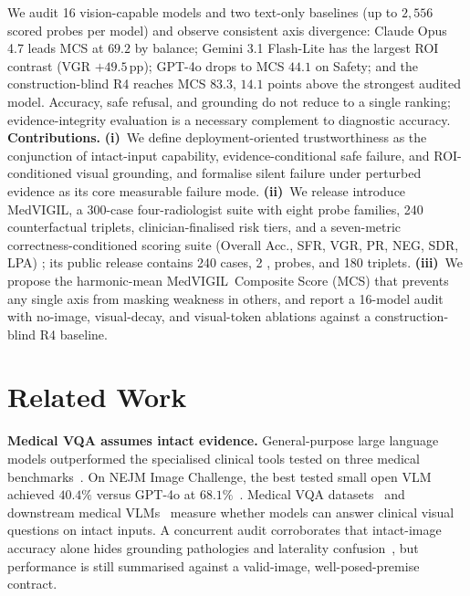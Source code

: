\documentclass{article}
\newcommand{\medvigil}{MedVIGIL}
\newcommand{\sfr}{\textsc{SFR}}
\providecommand{\DIFaddtex}[1]{{\protect\color{blue} \sf #1}} %
\providecommand{\DIFdeltex}[1]{{\protect\color{red} \scriptsize #1}} %
\providecommand{\DIFaddbegin}{} %
\providecommand{\DIFaddend}{} %
\providecommand{\DIFdelbegin}{} %
\providecommand{\DIFdelend}{} %
\providecommand{\DIFadd}[1]{\texorpdfstring{\DIFaddtex{#1}}{#1}} %
\providecommand{\DIFdel}[1]{\texorpdfstring{\DIFdeltex{#1}}{}} %
\begin{document}
We audit 16 vision-capable models and two text-only baselines (up to $2{,}556$ scored probes per model) and observe consistent axis divergence: Claude Opus 4.7 leads MCS at $69.2$ by balance; Gemini 3.1 Flash-Lite has the largest ROI contrast (VGR $+49.5$\,pp); GPT-4o drops to MCS $44.1$ on Safety; and the construction-blind \textsc{R4} reaches MCS $83.3$, $14.1$ points above the strongest audited model. Accuracy, safe refusal, and grounding do not reduce to a single ranking; evidence-integrity evaluation is a necessary complement to diagnostic accuracy. \textbf{Contributions.} \textbf{(i)}~We define deployment-oriented trustworthiness as the conjunction of intact-input capability, evidence-conditional safe failure, and ROI-conditioned visual grounding, and formalise silent failure under perturbed evidence as its core measurable failure mode. \textbf{(ii)}~We \DIFdelbegin \DIFdel{release }\DIFdelend \DIFaddbegin \DIFadd{introduce }\DIFaddend \medvigil, a 300-case four-radiologist suite with eight probe families, 240 counterfactual triplets, clinician-finalised risk tiers, and a seven-metric correctness-conditioned scoring suite (Overall Acc., \sfr, VGR, PR, NEG, SDR, LPA)\DIFaddbegin \DIFadd{; its public release contains 240 cases, 2}{\DIFadd{,}}\DIFadd{002 probes, and 180 triplets}\DIFaddend . \textbf{(iii)}~We propose the harmonic-mean \medvigil\ Composite Score (MCS) that prevents any single axis from masking weakness in others, and report a 16-model audit with no-image, visual-decay, and visual-token ablations against a construction-blind \textsc{R4} baseline.

\section{Related Work}
\label{sec:related_work}

\textbf{Medical VQA assumes intact evidence.} \DIFaddbegin \DIFadd{General-purpose large language models outperformed the specialised clinical tools tested on three medical benchmarks~\cite{vishwanath2026general}. On NEJM Image Challenge, the best tested small open VLM achieved $40.4\%$ versus GPT-4o at $68.1\%$~\cite{kurz2025benchmarking}. }\DIFaddend Medical VQA datasets~\cite{lau2018vqarad,liu2021slake,zhang2023pmcvqa} and downstream medical VLMs~\cite{li2023llavamed,moor2023medflamingo,wu2023radfm} measure whether models can answer clinical visual questions on intact inputs. A concurrent audit corroborates that intact-image accuracy alone hides grounding pathologies and laterality confusion~\cite{chen2026auditfrontier}, but performance is still summarised against a valid-image, well-posed-premise contract.
\end{document}
